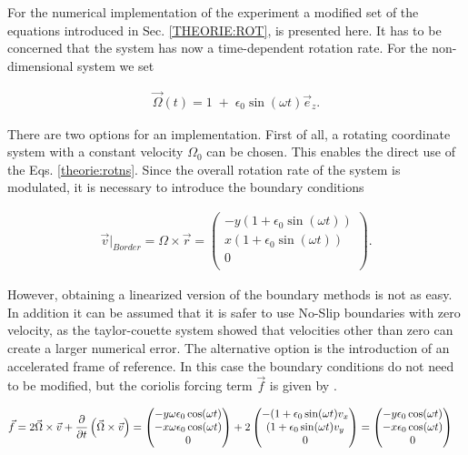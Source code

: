 For the numerical implementation of the experiment a modified set of the equations
introduced in Sec. \ref{THEORIE:ROT}, is presented here.
It has to be concerned that the system has now a time-dependent rotation rate.
For the non-dimensional system we set

\begin{align}
    \vec{\Omega}(t) = 1 \; + \; \epsilon_0 \sin(\omega t)\vec{e}_z.
\end{align}

There are two options for an implementation.
First of all, a rotating coordinate system with a constant velocity $\Omega_0$ can be chosen.
This enables the direct use of the Eqs. \ref{theorie:rotns}. Since the overall rotation rate of the system is
modulated, it is necessary to introduce the boundary conditions

\begin{align}
    \vec{v}|_{Border}  = \Omega \times \vec{r} = \begin{pmatrix}
           -y ( 1 + \epsilon_0 \sin(\omega t)) \\
            x ( 1 + \epsilon_0 \sin(\omega t)) \\
           0\\
         \end{pmatrix}.
\end{align}

However, obtaining a linearized version of the boundary methods is not as easy.
In addition it can be assumed that it is safer to use No-Slip boundaries with zero velocity, as
the taylor-couette system showed that velocities other than zero can create a larger numerical error.
The alternative option is the introduction of an accelerated frame of reference.
In this case the boundary conditions do not need to be modified, but the coriolis forcing term $\vec{f}$ is given by \citep{Tilgner2007}.

\begin{align}
    \vec{f} &= 2 \vec{\Omega} \times \vec{v} + \pdn[]{t}\left(\vec{\Omega} \times \vec{v} \right)
            = \begin{pmatrix}
           -y \omega \epsilon_0 \cos(\omega t) \\
           -x \omega \epsilon_0 \cos(\omega t) \\
           0\\
         \end{pmatrix}
            + 2\begin{pmatrix}
           - ( 1 + \epsilon_0 \sin(\omega t)v_x \\
             ( 1 + \epsilon_0 \sin(\omega t)v_y \\
           0\\
         \end{pmatrix}
            = \begin{pmatrix}
           -y \epsilon_0 \cos(\omega t) \\
           -x \epsilon_0 \cos(\omega t) \\
           0\\
         \end{pmatrix}
\end{align}

